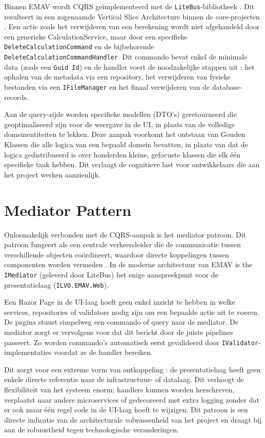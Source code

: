 Binnen EMAV wordt CQRS geïmplementeerd met de \texttt{LiteBus}-bibliotheek \autocite{litebus}. 
Dit resulteert in een zogenaamde Vertical Slice Architecture binnen de core-projecten \autocite{jimmyBogardVerticalSlice}. 
Een actie zoals het verwijderen van een berekening wordt niet afgehandeld door een generieke CalculationService, maar door een specifieke \texttt{DeleteCalculationCommand} en de bijbehorende \texttt{DeleteCalculationCommandHandler}. 
Dit commando bevat enkel de minimale data (zoals een \texttt{Guid Id}) en de handler voert de noodzakelijke stappen uit : het ophalen van de metadata via een repository, het verwijderen van fysieke bestanden via een \texttt{IFileManager} en het finaal verwijderen van de database-records.

Aan de query-zijde worden specifieke modellen (DTO's) geretourneerd die geoptimaliseerd zijn voor de weergave in de UI, in plaats van de volledige domeinentiteiten te lekken. 
Deze aanpak voorkomt het ontstaan van Gouden Klassen die alle logica van een bepaald domein bevatten, in plaats van dat de logica gedistribueerd is over honderden kleine, gefocuste klassen die elk één specifieke taak hebben. 
Dit verlaagt de cognitieve last voor ontwikkelaars die aan het project werken aanzienlijk.

\section{Mediator Pattern}
Onlosmakelijk verbonden met de CQRS-aanpak is het mediator patroon. 
Dit patroon fungeert als een centrale verkeersleider die de communicatie tussen verschillende objecten coördineert, waardoor directe koppelingen tussen componenten worden vermeden \autocite{gof1994}. 
In de moderne architectuur van EMAV is the \texttt{IMediator} (geleverd door LiteBus) het enige aanspreekpunt voor de presentatielaag (\texttt{ILVO.EMAV.Web}).

Een Razor Page in de UI-laag hoeft geen enkel inzicht te hebben in welke services, repositories of validators nodig zijn om een bepaalde actie uit te voeren. 
De pagina stuurt simpelweg een commando of query naar de mediator. 
De mediator zorgt er vervolgens voor dat dit bericht door de juiste pipelines passeert. 
Zo worden commando's automatisch eerst gevalideerd door \texttt{IValidator}-implementaties voordat ze de handler bereiken.

Dit zorgt voor een extreme vorm van ontkoppeling : de presentatielaag heeft geen enkele directe referentie naar de infrastructuur- of datalaag. 
Dit verhoogt de flexibiliteit van het systeem enorm; handlers kunnen worden herschreven, verplaatst naar andere microservices of gedecoreerd met extra logging zonder dat er ook maar één regel code in de UI-laag hoeft te wijzigen. 
Dit patroon is een directe indicatie van de architecturale volwassenheid van het project en draagt bij aan de robuustheid tegen technologische veranderingen.

